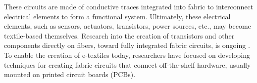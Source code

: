 % 
% 
% 
% 
These circuits are made of conductive traces integrated into fabric to interconnect electrical elements to form a functional system. Ultimately, these electrical elements, such as sensors, actuators, transistors, power sources, etc., may become textile-based themselves. Research into the creation of transistors and other components directly on fibers, toward fully integrated fabric circuits, is ongoing \cite{schwarz2010steps}. 
To enable the creation of e-textiles today, researchers have focused on developing techniques for creating fabric circuits that connect off-the-shelf hardware, usually mounted on printed circuit boards (PCBs).






